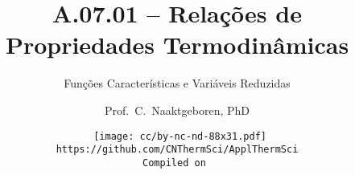 \makeatletter
\immediate{} %
\makeatother



\newcommand{\dxyz}[3]{\left(\frac{\partial {#1}}{\partial {#2}}\right)_{#3}} %
\newcommand{\lxyz}[3]{(\partial {#1}/\partial {#2})_{#3}}                    %
\title{A.07.01 -- Relações de Propriedades Termodinâmicas}
\subtitle{Funções Características e Variáveis Reduzidas}
\author{Prof.~C.~Naaktgeboren, PhD}
\date{{\scriptsize\tt%
    \texttt{[image: cc/by-nc-nd-88x31.pdf]}\\[\smallskipamount]
    https://github.com/CNThermSci/ApplThermSci\\
    Compiled on 
}}

\frame{\titlepage}

\frame{\tableofcontents}

